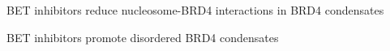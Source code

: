 \documentclass{beamer}					%
\begin{document}
\begin{frame}{BET inhibitors reduce nucleosome-BRD4 interactions in BRD4 condensates}
\end{frame}

\begin{frame}{BET inhibitors promote disordered BRD4 condensates }
\end{frame}

\end{document}

